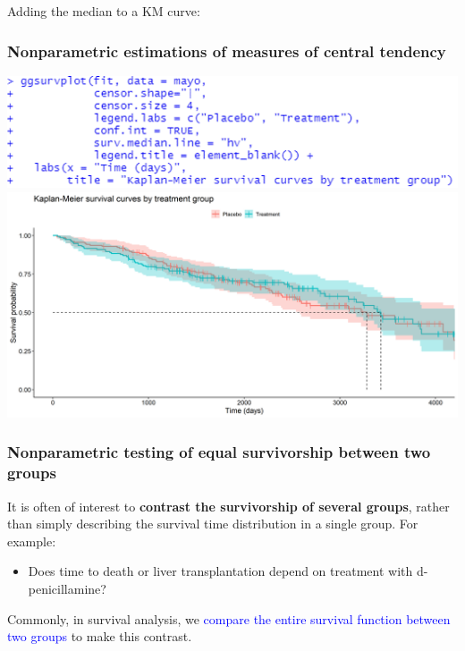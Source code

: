 \documentclass[10pt,t]{beamer}
\begin{document}
\begin{frame}
	\vspace{-0.5cm}
	Adding the median to a KM curve:
	\frametitle{Nonparametric estimations of measures of central tendency} 
	\begin{center}
		\includegraphics[height=0.3\textheight]{figs/KM_strat_medians_code.png}
		\includegraphics[width=\textwidth]{figs/KM_strat_medians.png}
	\end{center}
\end{frame}

\begin{frame}
\frametitle{Nonparametric testing of equal survivorship between two groups}

It is often of interest to \textbf{contrast the survivorship of several groups}, rather than simply describing the survival time distribution in a single group. For example:
\begin{itemize}
\item Does time to death or liver transplantation depend on treatment with d-penicillamine? 
\end{itemize}

Commonly, in survival analysis, we \textcolor{blue}{compare the entire survival function between two groups} to make this contrast.
\end{frame}
\end{document}
